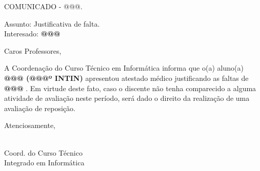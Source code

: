\documentclass[a5paper, 12pt]{letter}
\begin{document}
\noindent COMUNICADO - @@@.

\noindent Assunto: Justificativa de falta.\\
Interesado: {\bf @@@ }

\noindent Caros Professores,

\onehalfspacing A Coordenação do Curso Técnico em Informática informa que o(a) aluno(a) {\bf @@@ (@@@º INTIN) } apresentou atestado médico justificando as faltas de {\bf @@@ }. Em virtude deste fato, caso o discente não tenha comparecido a alguma atividade de avaliação neste período, será dado o direito da realização de uma avaliação de reposição.

\noindent Atenciosamente,

\begin{flushright}
\\
\indent Coord. do Curso Técnico\\
\indent Integrado em Informática\\
\end{flushright}
\end{document}
